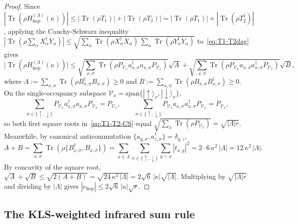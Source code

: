 \documentclass[11pt]{article}
\theoremstyle{definition}
\theoremstyle{remark}
\DeclareMathOperator{\Tr}{Tr}
\newcommand{\calV}{\mathcal{V}}
\begin{document}
\begin{proof}
Since $|\Tr(\rho H_{\mathrm{hop}}^{(\Lambda)}(\kappa))| \le |\Tr(\rho T_1)| + |\Tr(\rho T_2)| = |\Tr(\rho T_1)| + |\Tr(\rho T_2^\dagger)|$, applying the Cauchy-Schwarz inequality $|\Tr(\rho \sum_\alpha X_\alpha^\dagger Y_\alpha)| \le \sqrt{\sum_\alpha \Tr(\rho X_\alpha^\dagger X_\alpha)\,\sum_\alpha \Tr(\rho Y_\alpha^\dagger Y_\alpha)}$ to~\eqref{eq:T1-T2dag} gives
\begin{equation}\label{eq:T1-T2-CS}
\big|\Tr(\rho H_{\mathrm{hop}}^{(\Lambda)}(\kappa))\big| \le \sqrt{\sum_{x,\sigma}\Tr\!\left(\rho P_{\calV_x} a_{x,\sigma}^\dagger a_{x,\sigma} P_{\calV_x}\right)} \sqrt{A} + \sqrt{\sum_{x,\sigma}\Tr\!\left(\rho P_{\calV_x} a_{x,\sigma} a_{x,\sigma}^\dagger P_{\calV_x}\right)} \sqrt{B},
\end{equation}
where $A := \sum_{x,\sigma}\Tr(\rho B_{x,\sigma}^\dagger B_{x,\sigma}) \ge 0$ and $B := \sum_{x,\sigma}\Tr(\rho B_{x,\sigma} B_{x,\sigma}^\dagger) \ge 0$. On the single-occupancy subspace $\calV_x = \mathrm{span}\{|\uparrow\rangle_x, |\downarrow\rangle_x\}$,
\begin{equation*}
\sum_{\sigma \in \{\uparrow,\downarrow\}} P_{\calV_x} a_{x,\sigma}^\dagger a_{x,\sigma} P_{\calV_x} = P_{\calV_x}, \qquad \sum_{\sigma \in \{\uparrow,\downarrow\}} P_{\calV_x} a_{x,\sigma} a_{x,\sigma}^\dagger P_{\calV_x} = P_{\calV_x},
\end{equation*}
so both first square roots in~\eqref{eq:T1-T2-CS} equal $\sqrt{\sum_x \Tr(\rho P_{\calV_x})} = \sqrt{|\Lambda| r}$. Meanwhile, by canonical anticommutation $\{a_{y,\sigma}, a_{z,\sigma}^\dagger\} = \delta_{y,z}$,
\begin{equation}\label{eq:A-plus-B}
A + B = \sum_{x,\sigma} \Tr\!\left(\rho \{B_{x,\sigma}^\dagger, B_{x,\sigma}\}\right) = \sum_{x \in \Lambda} \sum_{\sigma \in \{\uparrow,\downarrow\}} \sum_{y \sim x} |t_{x,y}|^2 = 2 \cdot 6\,\kappa^2\,|\Lambda| = 12\,\kappa^2\,|\Lambda|.
\end{equation}
By concavity of the square root, $\sqrt{A} + \sqrt{B} \le \sqrt{2(A+B)} = \sqrt{24\,\kappa^2\,|\Lambda|} = 2\sqrt{6}\,|\kappa|\sqrt{|\Lambda|}$. Multiplying by $\sqrt{|\Lambda|r}$ and dividing by $|\Lambda|$ gives $|e_{\mathrm{hop}}| \le 2\sqrt{6}\,|\kappa|\sqrt{r}$.
\end{proof}

\subsection{The KLS-weighted infrared sum rule}\label{subsec:kls}
\end{document}
